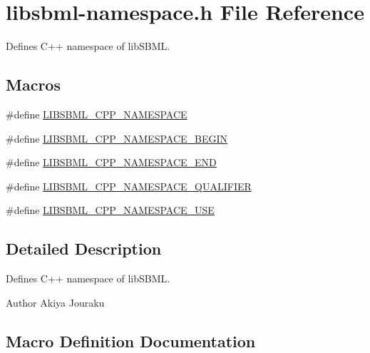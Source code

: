 \hypertarget{libsbml-namespace_8h}{}\section{libsbml-\/namespace.h File Reference}
\label{libsbml-namespace_8h}


Defines C++ namespace of lib\+S\+B\+ML.  


\subsection*{Macros}
\begin{DoxyCompactItemize}
\item 
\#define \hyperlink{libsbml-namespace_8h_a51e24a6488e9f3acfd799ac2614e197a}{L\+I\+B\+S\+B\+M\+L\+\_\+\+C\+P\+P\+\_\+\+N\+A\+M\+E\+S\+P\+A\+CE}
\item 
\#define \hyperlink{libsbml-namespace_8h_a41d9f1012efdaa799c31e8e4ddde0fbd}{L\+I\+B\+S\+B\+M\+L\+\_\+\+C\+P\+P\+\_\+\+N\+A\+M\+E\+S\+P\+A\+C\+E\+\_\+\+B\+E\+G\+IN}
\item 
\#define \hyperlink{libsbml-namespace_8h_ab1841eceb76d5f2baade2e6b6ffec7c1}{L\+I\+B\+S\+B\+M\+L\+\_\+\+C\+P\+P\+\_\+\+N\+A\+M\+E\+S\+P\+A\+C\+E\+\_\+\+E\+ND}
\item 
\#define \hyperlink{libsbml-namespace_8h_a4bbb9ad60b796c6821447c0f42d2a99c}{L\+I\+B\+S\+B\+M\+L\+\_\+\+C\+P\+P\+\_\+\+N\+A\+M\+E\+S\+P\+A\+C\+E\+\_\+\+Q\+U\+A\+L\+I\+F\+I\+ER}
\item 
\#define \hyperlink{libsbml-namespace_8h_afbb980e7a6c7711bfc7ba22289c033b8}{L\+I\+B\+S\+B\+M\+L\+\_\+\+C\+P\+P\+\_\+\+N\+A\+M\+E\+S\+P\+A\+C\+E\+\_\+\+U\+SE}
\end{DoxyCompactItemize}


\subsection{Detailed Description}
Defines C++ namespace of lib\+S\+B\+ML. 

\begin{DoxyAuthor}{Author}
Akiya Jouraku 
\end{DoxyAuthor}


\subsection{Macro Definition Documentation}
\mbox{\label{libsbml-namespace_8h_a51e24a6488e9f3acfd799ac2614e197a}} 
